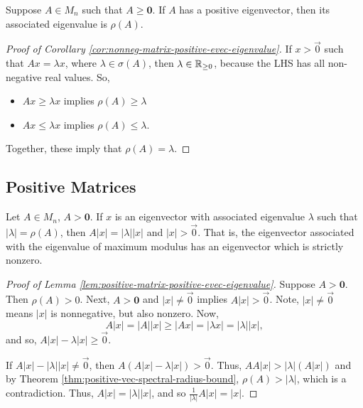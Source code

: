 \begin{corollary}
\label{cor:nonneg-matrix-positive-evec-eigenvalue}
Suppose $A \in M_n$ such that $A \ge \mathbf{0}$. If $A$ has a positive eigenvector, then its associated eigenvalue is $\rho(A)$.
\end{corollary}

\begin{proof}[Proof of Corollary \ref{cor:nonneg-matrix-positive-evec-eigenvalue}]
If $x > \Vec{0}$ such that $Ax = \lambda x$, where $\lambda \in \sigma(A)$, then $\lambda \in \mathbb R_{\ge 0}$, because the LHS has all non-negative real values. So,
\begin{itemize}
    \item $Ax \ge \lambda x$ implies $\rho(A) \ge \lambda$
    \item $Ax \le \lambda x$ implies $\rho(A) \le \lambda$.
\end{itemize}
Together, these imply that $\rho(A) = \lambda$.
\end{proof}

\subsection{Positive Matrices}
\begin{lemma}
\label{lem:positive-matrix-positive-evec-eigenvalue}
Let $A \in M_n$, $A > \mathbf{0}$. If $x$ is an eigenvector with associated eigenvalue $\lambda$ such that $|\lambda| = \rho(A)$, then $A|x| = |\lambda||x|$ and $|x| > \Vec{0}$. That is, the eigenvector associated with the eigenvalue of maximum modulus has an eigenvector which is strictly nonzero.
\end{lemma}

\begin{proof}[Proof of Lemma \ref{lem:positive-matrix-positive-evec-eigenvalue}]
Suppose $A > \mathbf{0}$. Then $\rho(A) > 0$. Next, $A > \mathbf{0}$ and $|x| \not=\Vec{0}$ implies $A|x| > \Vec{0}$. Note, $|x|\not=\Vec{0}$ means $|x|$ is nonnegative, but also nonzero. Now,
\[
A|x| = |A||x| \ge |Ax| = |\lambda x| = |\lambda||x|,
\]
and so, $A|x| - \lambda|x| \ge \Vec{0}$.

If $A|x| - |\lambda||x|\not=\Vec{0}$, then $A\left(A|x|-\lambda|x|\right) > \Vec{0}$. Thus, $AA|x| > |\lambda|(A|x|)$ and by Theorem \ref{thm:positive-vec-spectral-radius-bound}, $\rho(A) > |\lambda|$, which is a contradiction. Thus, $A|x| = |\lambda||x|$, and so $\frac{1}{|\lambda|}A|x| = |x|$.
\end{proof}

